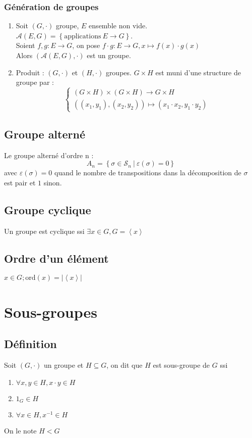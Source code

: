 \documentclass[a4paper,10pt]{report}
\newcommand{\grp}[1]{\left\langle #1 \right\rangle} %
\newcommand{\set}[1]{\left\lbrace #1 \right\rbrace } %
\newcommand{\ord}{\mathrm{ord}} %
\newcommand{\such}{\ \Big| \ }
\begin{document}
   \subsection{Génération de groupes}
    \begin{enumerate}
      \item Soit $(G,\cdot)$ groupe, $E$ ensemble non vide.
	$\mathcal{A}(E,G)=\set{\mathrm{applications} \  E \to G}$.\\
        Soient $f,g: E \to G$, on pose
	$f \cdot g : E \to G, x \mapsto f(x) \cdot g(x)$\\
        Alors $(\mathcal{A}(E,G), \cdot)$ est un groupe.
      \item Produit : $(G, \cdot)$ et $(H, \cdot)$ groupes. 
	$G \times H$ est muni d'une structure de groupe par :
        $$
        \begin{cases}
          (G \times H) \times (G \times H) \to G \times H\\
          ((x_1,y_1),(x_2,y_2)) \mapsto (x_1 \cdot x_2, y_1 \cdot y_2)
        \end{cases}$$
    \end{enumerate}

  \section{Groupe alterné}
   Le groupe alterné d'ordre n :
   $$A_n=\set{\sigma \in \mathcal{S}_n \such \varepsilon(\sigma)=0}$$
   avec $\varepsilon(\sigma)=0$ quand le nombre de transpositions dans la
   décomposition de $\sigma$ est pair et $1$ sinon.
  \section{Groupe cyclique}
   Un groupe est cyclique ssi $\exists x \in G, G= \grp{x}$

  \section{Ordre d'un élément}
   $x \in G; \ord(x) = |\grp{x}|$
 \chapter{Sous-groupes}
  \section{Définition}
   Soit $(G, \cdot)$ un groupe et $H \subseteq G$, on dit que $H$ est
   sous-groupe de $G$ ssi
   \begin{enumerate}
     \item $\forall x,y \in H, x \cdot y \in H$
     \item $1_G \in H$
     \item $\forall x \in H, x^{-1} \in H$
   \end{enumerate}
   On le note $H < G$
\end{document}
